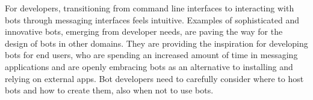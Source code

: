 \documentclass{sig-alternate}
\newcommand{\cp}[1]{\textcolor{red}{{\it [Cassie says: #1]}}}
\newcommand{\cp}[1]{}
\begin{document}



For developers, transitioning from command line interfaces to interacting with bots through messaging interfaces feels intuitive.
Examples of sophisticated and innovative bots, emerging from developer needs, are paving the way for the design of bots in other domains. 
They are providing the inspiration for developing bots for end users, who are spending an increased amount of time in messaging applications and are openly embracing bots as an alternative to installing and relying on external apps.
Bot developers need to carefully consider where to host bots and how to create them, also when not to use bots. 
\end{document}

